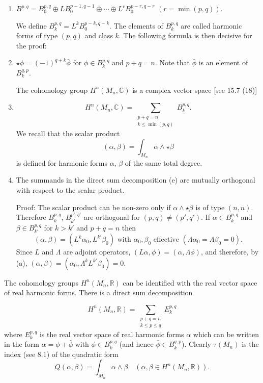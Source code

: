 \documentclass{book}
\let\temp\phi
\let\phi\varphi
\let\varphi\temp
\begin{document}
\begin{Proof}
\begin{enumerate}
\item $B^{p,q} = B_0^{p,q} \oplus LB_0^{p-1,q-1} \oplus \cdots \oplus L^r B_0^{p-r,q-r}$ $(r = \min(p,q))$.

We define $B_k^{p,q} = L^k B_0^{p-k,q-k}$. The elements of $B_k^{p,q}$ are called harmonic forms of type $(p,q)$ and class $k$. The following formula is then decisive for the proof:

\item $\star\varphi = (-1)^{q+k}\bar{\varphi}$ for $\varphi \in B_k^{p,q}$ and $p+q=n$. Note that $\bar{\varphi}$ is an element of $B_k^{q,p}$.

The cohomology group $H^n(M_n,\mathbb{C})$ is a complex vector space [see {\color{red} 15.7 (18)}]
\item
\[
  H^n(M_n,\mathbb{C}) = \sum_{\substack{p+q=n \\k \leq \min(p,q)}} B_k^{p,q}.
\]
We recall that the scalar product
\[
    (\alpha,\beta) = \int_{M_n} \alpha \wedge \star\beta
\]
is defined for harmonic forms $\alpha$, $\beta$ of the same total degree.

\item The summands in the direct sum decomposition (e) are mutually orthogonal with respect to the scalar product.

Proof: The scalar product can be non-zero only if $\alpha \wedge \star\beta$ is of type $(n,n)$. Therefore $B_k^{p,q}$, $B_{k'}^{p',q'}$ are orthogonal for $(p,q) \neq (p',q')$. If $\alpha \in B_k^{p,q}$ and $\beta \in B_{k'}^{p,q}$ for $k > k'$ and $p+q=n$ then
\[
    (\alpha,\beta) = (L^k \alpha_0, L^{k'} \beta_0) \text{ with } \alpha_0, \beta_0 \text{ effective } (\Lambda \alpha_0 = \Lambda \beta_0 = 0).
\]
Since $L$ and $\Lambda$ are adjoint operators, $(L\alpha,\varphi) = (\alpha,\Lambda\varphi)$, and therefore, by (a), $(\alpha,\beta) = (\alpha_0,\Lambda^k L^{k'} \beta_0) = 0$.
\end{enumerate}

The cohomology groups $H^n(M_n,\mathbb{R})$ can be identified with the real vector space of real harmonic forms. There is a direct sum decomposition

\[
  H^n(M_n,\mathbb{R}) = \sum_{\substack{p+q=n \\ k \leq p \leq q}} E_k^{p,q}
\]
where $E_k^{p,q}$ is the real vector space of real harmonic forms $\alpha$ which can be written in the form $\alpha = \varphi + \bar{\varphi}$ with $\varphi \in B_k^{p,q}$ (and hence $\bar{\varphi} \in B_k^{q,p}$). Clearly $\tau(M_n)$ is the index (see {\color{red} 8.1}) of the quadratic form
\[
    Q(\alpha,\beta) = \int_{M_n} \alpha \wedge \beta \quad (\alpha,\beta \in H^n(M_n,\mathbb{R})).
\]


\end{Proof}
\end{document}
